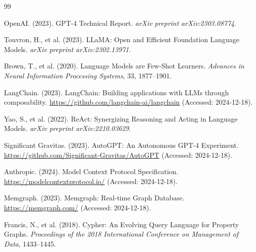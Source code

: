 \documentclass[a4paper,twoside]{sapthesis}
\begin{document}
\cleardoublepage
{}  %



\begin{thebibliography}{99}

OpenAI. (2023). GPT-4 Technical Report. \textit{arXiv preprint arXiv:2303.08774}.

Touvron, H., et al. (2023). LLaMA: Open and Efficient Foundation Language Models. \textit{arXiv preprint arXiv:2302.13971}.

Brown, T., et al. (2020). Language Models are Few-Shot Learners. \textit{Advances in Neural Information Processing Systems}, 33, 1877--1901.

LangChain. (2023). LangChain: Building applications with LLMs through composability. \url{https://github.com/langchain-ai/langchain} (Accessed: 2024-12-18).

Yao, S., et al. (2022). ReAct: Synergizing Reasoning and Acting in Language Models. \textit{arXiv preprint arXiv:2210.03629}.

Significant Gravitas. (2023). AutoGPT: An Autonomous GPT-4 Experiment. \url{https://github.com/Significant-Gravitas/AutoGPT} (Accessed: 2024-12-18).

Anthropic. (2024). Model Context Protocol Specification. \url{https://modelcontextprotocol.io/} (Accessed: 2024-12-18).

Memgraph. (2023). Memgraph: Real-time Graph Database. \url{https://memgraph.com/} (Accessed: 2024-12-18).

Francis, N., et al. (2018). Cypher: An Evolving Query Language for Property Graphs. \textit{Proceedings of the 2018 International Conference on Management of Data}, 1433--1445.


\end{thebibliography}
\end{document}
